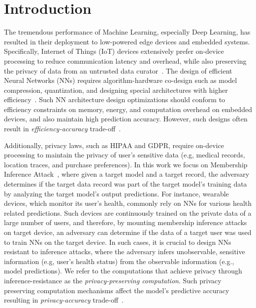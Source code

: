 \section{Introduction}\label{introduction}

The tremendous performance of Machine Learning, especially Deep Learning, has resulted in their deployment to low-powered edge devices and embedded systems.
Specifically, Internet of Things (IoT) devices extensively prefer on-device processing to reduce communication latency and overhead, while also preserving the privacy of data from an untrusted data curator~\cite{8110880}.
The design of efficient Neural Networks (NNs) requires algorithm-hardware co-design such as model compression, quantization, and designing special architectures with higher efficiency~\cite{8114708}.
Such NN architecture design optimizations should conform to efficiency constraints on memory, energy, and computation overhead on embedded devices, and also maintain high prediction accuracy.
However, such designs often result in \textit{efficiency-accuracy} trade-off~\cite{rastegari2016xnornet}.

Additionally, privacy laws, such as HIPAA and GDPR, require on-device processing to maintain the privacy of user's sensitive data (e.g, medical records, location traces, and purchase preferences).
In this work we focus on Membership Inference Attack~\cite{shokri2017membership}, where given a target model and a target record, the adversary determines if the target data record was part of the target model's training data by analyzing the target model's output predictions.
For instance, wearable devices, which monitor its user's health, commonly rely on NNs for various health related predictions.
Such devices are continuously trained on the private data of a large number of users, and therefore, by mounting membership inference attacks on target device, an adversary can determine if the data of a target user was used to train NNs on the target device.
In such cases, it is crucial to design NNs resistant to inference attacks, where the adversary infers unobservable, sensitive information (e.g, user's health status) from the observable information (e.g., model predictions).
We refer to the computations that achieve privacy through inference-resistance as the {\em privacy-preserving computation}.
Such privacy preserving computation mechanisms affect the model's predictive accuracy resulting in \textit{privacy-accuracy} trade-off~\cite{Abadi:2016:DLD:2976749.2978318,DBLP:conf/ccs/NasrSH18,shejwalkar2019reconciling}.

